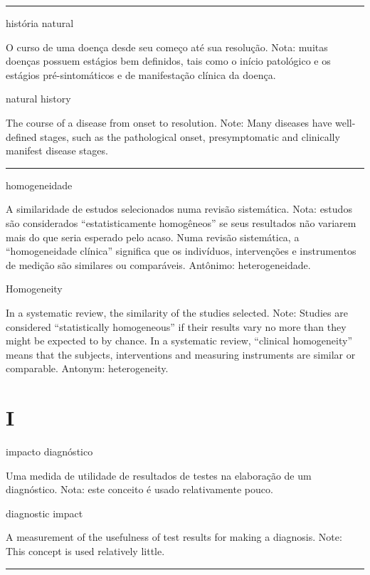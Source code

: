 \documentclass[
  openany]{book}
\begin{document}
\begin{center}\rule{0.5\linewidth}{0.5pt}\end{center}

história natural

O curso de uma doença desde seu começo até sua resolução. Nota: muitas doenças possuem estágios bem definidos, tais como o início patológico e os estágios pré-sintomáticos e de manifestação clínica da doença.

natural history

The course of a disease from onset to resolution. Note: Many diseases have well-defined stages, such as the pathological onset, presymptomatic and clinically manifest disease stages.

\begin{center}\rule{0.5\linewidth}{0.5pt}\end{center}

homogeneidade

A similaridade de estudos selecionados numa revisão sistemática. Nota: estudos são considerados ``estatisticamente homogêneos'' se seus resultados não variarem mais do que seria esperado pelo acaso. Numa revisão sistemática, a ``homogeneidade clínica'' significa que os indivíduos, intervenções e instrumentos de medição são similares ou comparáveis. Antônimo: heterogeneidade.

Homogeneity

In a systematic review, the similarity of the studies selected. Note: Studies are considered ``statistically homogeneous'' if their results vary no more than they might be expected to by chance. In a systematic review, ``clinical homogeneity'' means that the subjects, interventions and measuring instruments are similar or comparable. Antonym: heterogeneity.

\hypertarget{i}{%
\chapter*{I}\label{i}}

impacto diagnóstico

Uma medida de utilidade de resultados de testes na elaboração de um diagnóstico. Nota: este conceito é usado relativamente pouco.

diagnostic impact

A measurement of the usefulness of test results for making a diagnosis. Note: This concept is used relatively little.

\begin{center}\rule{0.5\linewidth}{0.5pt}\end{center}
\end{document}

